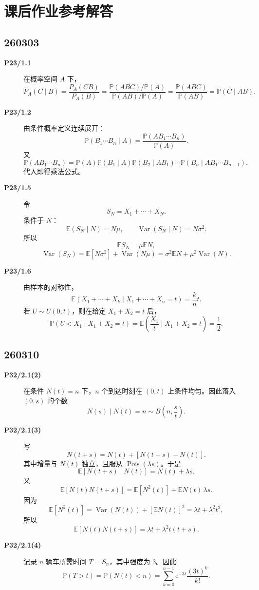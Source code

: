 \documentclass[12pt,a4paper,openany]{ctexrep}
\theoremstyle{definition}
\newcommand{\E}{\mathbb{E}}
\newcommand{\Var}{\operatorname{Var}}
\newcommand{\Pp}{\mathbb{P}}
\newcommand{\Pois}{\operatorname{Pois}}
\newcommand{\e}{\mathrm{e}}
\begin{document}
\section{课后作业参考解答}

\subsection*{260303}

\begin{description}
	\item[\textbf{P23/1.1}]
	在概率空间 $A$ 下，
	\[
	P_A(C\mid B)=\frac{P_A(CB)}{P_A(B)}
	=\frac{\Pp(ABC)/\Pp(A)}{\Pp(AB)/\Pp(A)}
	=\frac{\Pp(ABC)}{\Pp(AB)}
	=\Pp(C\mid AB).
	\]
	\item[\textbf{P23/1.2}]
	由条件概率定义连续展开：
	\[
	\Pp(B_1\cdots B_n\mid A)
	=
	\frac{\Pp(AB_1\cdots B_n)}{\Pp(A)}.
	\]
	又
	\[
	\Pp(AB_1\cdots B_n)
	=
	\Pp(A)\Pp(B_1\mid A)\Pp(B_2\mid AB_1)\cdots
	\Pp(B_n\mid AB_1\cdots B_{n-1}),
	\]
	代入即得乘法公式。
	\item[\textbf{P23/1.5}]
	令
	\[
	S_N=X_1+\cdots+X_N.
	\]
	条件于 $N$：
	\[
	\E(S_N\mid N)=N\mu,\qquad
	\Var(S_N\mid N)=N\sigma^2.
	\]
	所以
	\[
	\E S_N=\mu\E N,
	\]
	\[
	\Var(S_N)=\E[N\sigma^2]+\Var(N\mu)
	=\sigma^2\E N+\mu^2\Var(N).
	\]
	\item[\textbf{P23/1.6}]
	由样本的对称性，
	\[
	\E(X_1+\cdots+X_k\mid X_1+\cdots+X_n=t)
	=\frac{k}{n}t.
	\]
	若 $U\sim U(0,t)$，则在给定 $X_1+X_2=t$ 后，
	\[
	\Pp(U<X_1\mid X_1+X_2=t)
	=
	\E\left(\frac{X_1}{t}\mid X_1+X_2=t\right)
	=\frac12.
	\]
\end{description}

\subsection*{260310}

\begin{description}
	\item[\textbf{P32/2.1(2)}]
	在条件 $N(t)=n$ 下，$n$ 个到达时刻在 $(0,t)$ 上条件均匀。因此落入 $(0,s)$ 的个数
	\[
	N(s)\mid N(t)=n\sim B\left(n,\frac{s}{t}\right).
	\]
	\item[\textbf{P32/2.1(3)}]
	写
	\[
	N(t+s)=N(t)+[N(t+s)-N(t)].
	\]
	其中增量与 $N(t)$ 独立，且服从 $\Pois(\lambda s)$。于是
	\[
	\E[N(t+s)\mid N(t)]=N(t)+\lambda s.
	\]
	又
	\[
	\E[N(t)N(t+s)]
	=
	\E[N^2(t)]+\E N(t)\,\lambda s.
	\]
	因为
	\[
	\E[N^2(t)]=\Var(N(t))+[\E N(t)]^2=\lambda t+\lambda^2t^2,
	\]
	所以
	\[
	\E[N(t)N(t+s)]
	=
	\lambda t+\lambda^2t(t+s).
	\]
	\item[\textbf{P32/2.1(4)}]
	记录 $n$ 辆车所需时间 $T=S_n$，其中强度为 $3$。因此
	\[
	\Pp(T>t)=\Pp(N(t)<n)
	=
	\sum_{k=0}^{n-1}\e^{-3t}\frac{(3t)^k}{k!}.
	\]
\end{description}
\end{document}
